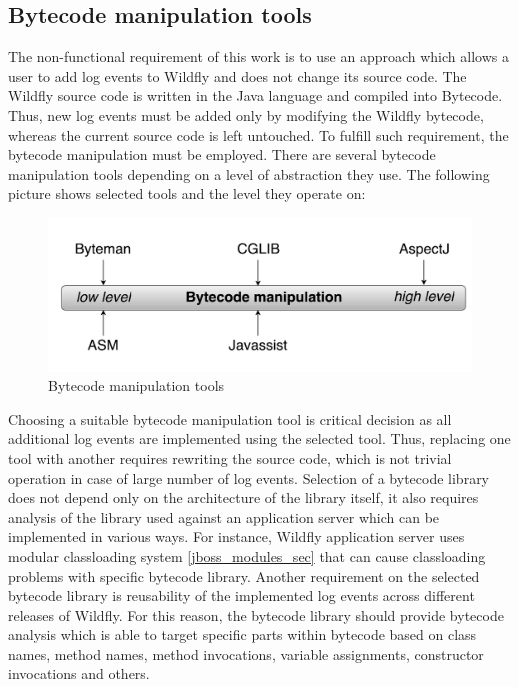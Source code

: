 \documentclass[12pt,oneside]{fithesis2}
\begin{document}
\subsection{Bytecode manipulation tools}
The non-functional requirement of this work is to use an approach which allows a user to add log events to Wildfly and does not change its source code. The Wildfly source code is written in the Java language and compiled into Bytecode. Thus, new log events must be added only by modifying the Wildfly bytecode, whereas the current source code is left untouched. To fulfill such requirement, the bytecode manipulation must be employed. There are several bytecode manipulation tools depending on a level of abstraction they use. The following picture shows selected tools and the level they operate on:
\begin{figure}[ht!]
	\centering
	\includegraphics[width=\textwidth]{images/bytecode_tools}
	\caption{Bytecode manipulation tools}
	\label{bytecode_tools}
\end{figure}

Choosing a suitable bytecode manipulation tool is critical decision as all additional log events are implemented using the selected tool. Thus, replacing one tool with another requires rewriting the source code, which is not trivial operation in case of large number of log events. Selection of a bytecode library does not depend only on the architecture of the library itself, it also requires analysis of the library used against an application server which can be implemented in various ways. For instance, Wildfly application server uses modular classloading system \ref{jboss_modules_sec} that can cause classloading problems with specific bytecode library. Another requirement on the selected bytecode library is reusability of the implemented log events across different releases of Wildfly. For this reason, the bytecode library should provide bytecode analysis which is able to target specific parts within bytecode based on class names, method names, method invocations, variable assignments, constructor invocations and others.
\end{document}
